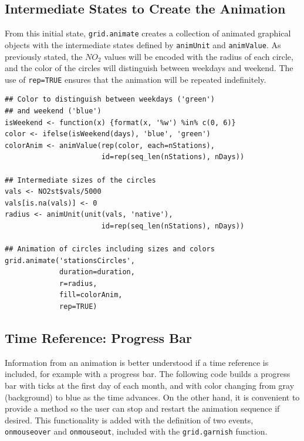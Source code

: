 \documentclass[smallroyalvopaper]{memoir}
\begin{document}
\subsection{Intermediate States to Create the Animation}
\label{sec-4-2}
From this initial state, \texttt{grid.animate} creates a collection of
animated graphical objects with the intermediate states defined by
\texttt{animUnit} and \texttt{animValue}.  As previously stated, the $NO_2$ values
will be encoded with the radius of each circle, and the color of the
circles will distinguish between weekdays and weekend.  The use of
\texttt{rep=TRUE} ensures that the animation will be repeated indefinitely.


\lstset{language=R,numbers=none}
\begin{lstlisting}
## Color to distinguish between weekdays ('green')
## and weekend ('blue')
isWeekend <- function(x) {format(x, '%w') %in% c(0, 6)}
color <- ifelse(isWeekend(days), 'blue', 'green')
colorAnim <- animValue(rep(color, each=nStations),
                       id=rep(seq_len(nStations), nDays))

## Intermediate sizes of the circles
vals <- NO2st$vals/5000
vals[is.na(vals)] <- 0
radius <- animUnit(unit(vals, 'native'),
                       id=rep(seq_len(nStations), nDays))                     

## Animation of circles including sizes and colors
grid.animate('stationsCircles',
             duration=duration,
             r=radius,
             fill=colorAnim,
             rep=TRUE)
\end{lstlisting}
\subsection{Time Reference: Progress Bar}
\label{sec-4-3}
Information from an animation is better understood if a time
reference is included, for example with a progress bar.  The following
code builds a progress bar with ticks at the first day of each
month, and with color changing from gray (background) to blue as
the time advances.  On the other hand, it is convenient to provide
a method so the user can stop and restart the animation sequence
if desired.  This functionality is added with the definition of
two events, \texttt{onmouseover} and \texttt{onmouseout}, included with the
\texttt{grid.garnish} function.
\end{document}
